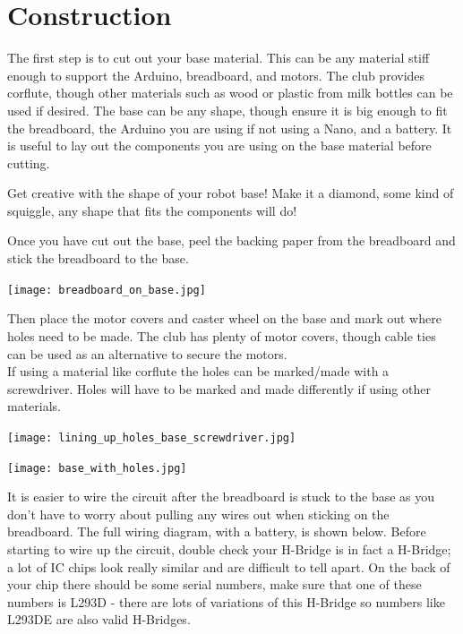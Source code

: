 \documentclass[../TinyBot.tex]{subfiles}
\begin{document}
\section{Construction} \label{sec:construction}

The first step is to cut out your base material. This can be any material stiff enough to support the Arduino, breadboard, and motors. The club provides corflute, though other materials such as wood or plastic from milk bottles can be used if desired. The base can be any shape, though ensure it is big enough to fit the breadboard, the Arduino you are using if not using a Nano, and a battery.
It is useful to lay out the components you are using on the base material before cutting. \\

\begin{notebox}
    Get creative with the shape of your robot base! Make it a diamond, some kind of squiggle, any shape that fits the components will do!    
\end{notebox}

Once you have cut out the base, peel the backing paper from the breadboard and stick the breadboard to the base.
\begin{center}
    \texttt{[image: breadboard\_on\_base.jpg]}
\end{center}

Then place the motor covers and caster wheel on the base and mark out where holes need to be made. The club has plenty of motor covers, though cable ties can be used as an alternative to secure the motors. \\
If using a material like corflute the holes can be marked/made with a screwdriver. Holes will have to be marked and made differently if using other materials. 
\begin{center}
    \texttt{[image: lining\_up\_holes\_base\_screwdriver.jpg]}
\end{center}

\begin{center}
    \texttt{[image: base\_with\_holes.jpg]}
\end{center}

It is easier to wire the circuit after the breadboard is stuck to the base as you don't have to worry about pulling any wires out when sticking on the breadboard. The full wiring diagram, with a battery, is shown below. Before starting to wire up the circuit, double check your H-Bridge is in fact a H-Bridge; a lot of IC chips look really similar and are difficult to tell apart. On the back of your chip there should be some serial numbers, make sure that one of these numbers is L293D - there are lots of variations of this H-Bridge so numbers like L293DE are also valid H-Bridges. \\
\end{document}
